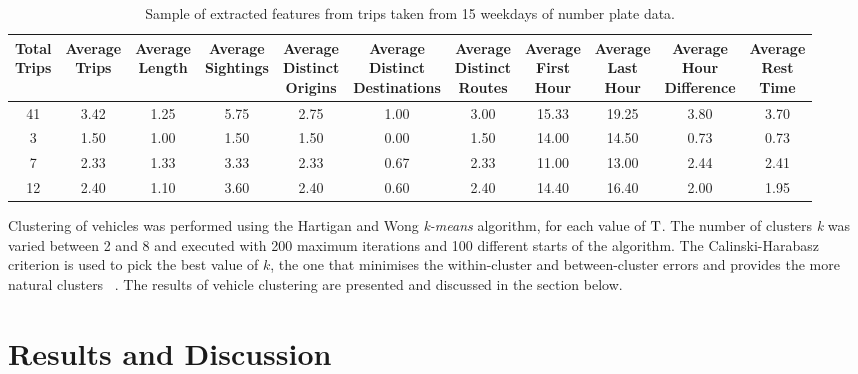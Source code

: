 \begin{table*}[t]
\centering
\begin{tabular}{c c c c c c c c c c c}
  \hline
 \thead{Total\\Trips} & \thead{Average\\Trips} & \thead{Average\\Length} & \thead{Average\\Sightings} & \thead{Average\\Distinct\\Origins} & \thead{Average\\Distinct\\Destinations} & \thead{Average\\Distinct\\Routes} & \thead{Average\\First\\Hour} & \thead{Average\\Last\\Hour} & \thead{Average\\Hour\\Difference} & \thead{Average\\Rest\\Time} \\
  \hline
41 & 3.42 & 1.25 & 5.75 & 2.75 & 1.00 & 3.00 & 15.33 & 19.25 & 3.80 & 3.70 \\
3 & 1.50 & 1.00 & 1.50 & 1.50 & 0.00 & 1.50 & 14.00 & 14.50 & 0.73 & 0.73 \\
7 & 2.33 & 1.33 & 3.33 & 2.33 & 0.67 & 2.33 & 11.00 & 13.00 & 2.44 & 2.41 \\
12 & 2.40 & 1.10 & 3.60 & 2.40 & 0.60 & 2.40 & 14.40 & 16.40 & 2.00 & 1.95 \\
   \hline
\end{tabular}
\caption{Sample of extracted features from trips taken from 15 weekdays of number plate data.}
\label{t:features}
\end{table*}

Clustering of vehicles was performed using the Hartigan and Wong \emph{k-means} algorithm, for each value of $\mathrm{T}$. The number of clusters \emph{k} was varied between 2 and 8 and executed with 200 maximum iterations and 100 different starts of the algorithm. The Calinski-Harabasz criterion is used to pick the best value of $k$, the one that minimises the within-cluster and between-cluster errors and provides the more natural clusters ~\cite{Kmeans}. The results of vehicle clustering are presented and discussed in the section below.

\section{Results and Discussion}\label{s.results}

